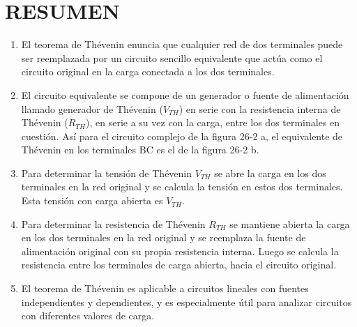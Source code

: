 \documentclass{article}
\begin{document}
\section*{RESUMEN}
\begin{enumerate}[label=\arabic*.]
    \item El teorema de Thévenin enuncia que cualquier red de dos terminales puede ser reemplazada por un circuito sencillo equivalente que actúa como el circuito original en la carga conectada a los dos terminales.
    
    \item El circuito equivalente se compone de un generador o fuente de alimentación llamado generador de Thévenin (\( V_{TH} \)) en serie con la resistencia interna de Thévenin (\( R_{TH} \)), en serie a su vez con la carga, entre los dos terminales en cuestión. Así para el circuito complejo de la figura 26-2 a, el equivalente de Thévenin en los terminales BC es el de la figura 26-2 b.
    
    \item Para determinar la tensión de Thévenin \( V_{TH} \) se abre la carga en los dos terminales en la red original y se calcula la tensión en estos dos terminales. Esta tensión con carga abierta es \( V_{TH} \).
    
    \item Para determinar la resistencia de Thévenin \( R_{TH} \) se mantiene abierta la carga en los dos terminales en la red original y se reemplaza la fuente de alimentación original con su propia resistencia interna. Luego se calcula la resistencia entre los terminales de carga abierta, hacia el circuito original.
    
    \item El teorema de Thévenin es aplicable a circuitos lineales con fuentes independientes y dependientes, y es especialmente útil para analizar circuitos con diferentes valores de carga.
\end{enumerate}
\end{document}
